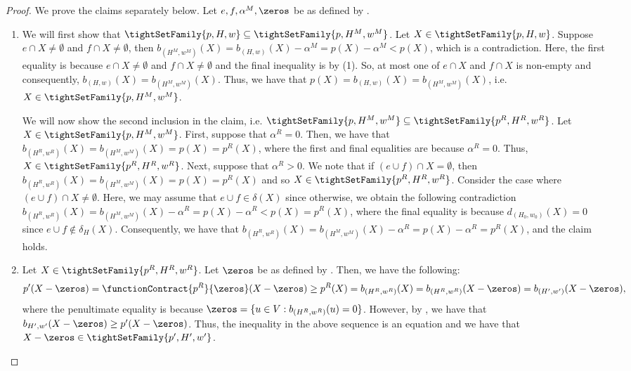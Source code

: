 \begin{proof} We prove the claims separately below. Let $e, f, \alpha^M, \zeros$ be as defined by .
\begin{enumerate}
    \item We will first show that $\tightSetFamily{p, H, w} \subseteq \tightSetFamily{p, H^M, w^M}$. Let $X \in \tightSetFamily{p, H, w}$. 
    Suppose $e\cap X\neq \emptyset$ and $f\cap X\neq \emptyset$, then 
        $b_{(H^M, w^M)}(X) = b_{(H,w)}(X) - \alpha^M = p(X) - \alpha^M < p(X)$, which is a contradiction. Here, the first equality is because $e\cap X\neq \emptyset$ and $f\cap X\neq \emptyset$ and the final inequality is by (1). 
        So, at most one of $e\cap X$ and $f\cap X$ is non-empty and consequently, $b_{(H,w)}(X)=b_{(H^M, w^M)}(X)$. 
        Thus, we have that $p(X) = b_{(H,w)}(X) = b_{(H^M, w^M)}(X)$, i.e. $X \in \tightSetFamily{p, H^M, w^M}$. 

        We will now show the second inclusion in the claim, i.e. $\tightSetFamily{p, H^M, w^M} \subseteq \tightSetFamily{p^R, H^R, w^R}$. Let $X \in \tightSetFamily{p, H^M, w^M} $. First, suppose that $\alpha^R = 0$. Then, we have that $b_{(H^R, w^R)}(X) = b_{(H^M, w^M)}(X) = p(X) = p^R(X)$, where the first and final equalities are because $\alpha^R = 0$. Thus, $X \in \tightSetFamily{p^R, H^R, w^R}$. Next, suppose that $\alpha^R > 0$. We note that if $(e\cup f) \cap X = \emptyset$, then $b_{(H^R,w^R)}(X) = b_{(H^M,w^M)}(X) = p(X) = p^R(X)$ and so $X \in \tightSetFamily{p^R, H^R, w^R}$. Consider the case where $(e\cup f) \cap X \not = \emptyset$. Here, we may assume that 
        $e\cup f\in \delta(X)$ since otherwise, 
        we obtain the following contradiction  $b_{(H^R, w^R)}(X) = b_{(H^M, w^M)}(X) - \alpha^R = p(X) - \alpha^R < p(X) = p^R(X)$, where the final equality is because $d_{(H_0, w_0)}(X) = 0$ since $e\cup f \not \in \delta_H(X)$. 
        Consequently, we have that $b_{(H^R, w^R)}(X) = b_{(H^M, w^M)}(X) - \alpha^R = p(X) - \alpha^R = p^R(X)$, and the claim holds. 
        
        \item Let $X \in \tightSetFamily{p^R, H^R, w^R}$.  Let $\zeros$ be as defined by . Then, we have the following:
        $$p'(X - \zeros) = \functionContract{p^R}{\zeros}(X - \zeros) \geq p^R(X) = b_{(H^R, w^R)}(X) = b_{(H^R, w^R)}(X - \zeros) = b_{(H', w')}(X - \zeros),$$
        where the penultimate equality is because $\zeros = \{u \in V : b_{(H^R, w^R)}(u) = 0\}$. However, by , we have that $b_{H',w'}(X - \zeros) \geq p'(X - \zeros)$. Thus, the inequality in the above sequence is an equation and we have that $X - \zeros \in \tightSetFamily{p', H', w'}$.
\end{enumerate}
\end{proof}
